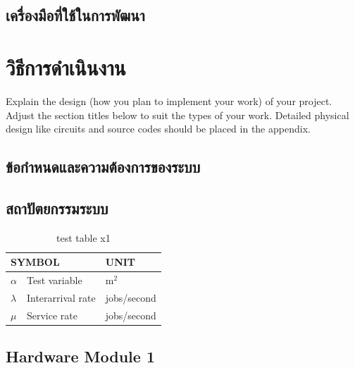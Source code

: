 \documentclass[12pt,oneside,openright,a4paper]{cpe-thai-project}
\begin{document}
\section{เครื่องมือที่ใช้ในการพัฒนา}

\chapter{วิธีการดำเนินงาน}

Explain the design (how you plan to implement your work) of your project. Adjust the section titles below to suit the types of your work. Detailed physical design like circuits and source codes should be placed in the appendix.

\section{ข้อกำหนดและความต้องการของระบบ}

\section{สถาปัตยกรรมระบบ}

\begin{table}[!h]
\centering
\caption{test table x1}\label{tbl:symbols}
\begin{tabular}{@{}p{}|p{}p{}}\hline
\multicolumn{2}{l}{\textbf{SYMBOL}}  & \textbf{UNIT} \\ \hline 
$\alpha$ & Test variable\hfill & m$^2$ \\
$\lambda$ & Interarrival rate\hfill &  jobs/second\\
$\mu$ & Service rate\hfill & jobs/second \\ \hline
\end{tabular}
\end{table}



\section{Hardware Module 1}
\end{document}
